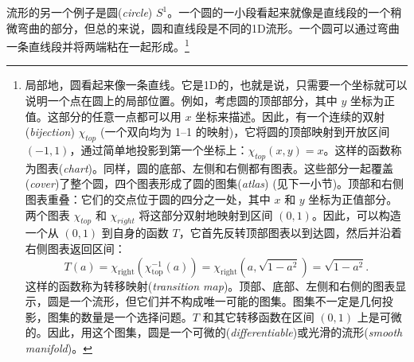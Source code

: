 \documentclass[11pt,fontset=founder]{ctexart}
\begin{document}
流形的另一个例子是圆(\textit{circle}) $S^{1}$。一个圆的一小段看起来就像是直线段的一个稍微弯曲的部分，但总的来说，圆和直线段是不同的1D流形。一个圆可以通过弯曲一条直线段并将两端粘在一起形成。\footnote{%
局部地，圆看起来像一条直线。它是1D的，也就是说，只需要一个坐标就可以说明一个点在圆上的局部位置。例如，考虑圆的顶部部分，其中 $y$ 坐标为正值。这部分的任意一点都可以用 $x$ 坐标来描述。因此，有一个连续的双射(\textit{bijection}) $\chi _{top}$ (一个双向均为 1--1 的映射)，它将圆的顶部映射到开放区间 $(-1,1)$，通过简单地投影到第一个坐标上：$\chi _{top}(x,y)=x$。这样的函数称为图表(\textit{chart})。同样，圆的底部、左侧和右侧都有图表。这些部分一起覆盖(\textit{cover})了整个圆，四个图表形成了圆的图集(\textit{atlas}) (见下一小节)。顶部和右侧图表重叠：它们的交点位于圆的四分之一处，其中 $x$ 和 $y$ 坐标为正值部分。两个图表 $\chi _{top}$ 和 $\chi _{right}$ 将这部分双射地映射到区间 $(0,1)$。因此，可以构造一个从 $(0,1)$ 到自身的函数 $T$，它首先反转顶部图表以到达圆，然后并沿着右侧图表返回区间：
\begin{equation*}
T(a)=\chi _{\mathrm{right}}\left( \chi _{\mathrm{top}}^{-1}(a)\right) =\chi
_{\mathrm{right}}\left( a,\sqrt{1-a^{2}}\right) =\sqrt{1-a^{2}}.
\end{equation*}%
这样的函数称为转移映射(\textit{transition map})。顶部、底部、左侧和右侧的图表显示，圆是一个流形，但它们并不构成唯一可能的图集。图集不一定是几何投影，图集的数量是一个选择问题。$T$ 和其它转移函数在区间 $(0,1)$ 上是可微的。因此，用这个图集，圆是一个可微的(\emph{differentiable})或光滑的流形(\emph{smooth manifold})。}
\end{document}
